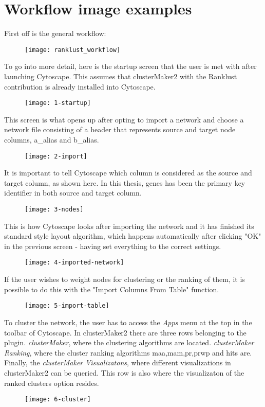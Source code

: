 \section{Workflow image examples}
First off is the general workflow:
\begin{figure}[H]
    \texttt{[image: ranklust\_workflow]}
\end{figure}

To go into more detail, here is the startup screen that the user is met with
after launching Cytoscape. This assumes that clusterMaker2 with the Ranklust
contribution is already installed into Cytoscape.
\begin{figure}[H]
    \texttt{[image: 1-startup]}
\end{figure}

This screen is what opens up after opting to import a network and choose a
network file consisting of a header that represents source and target node
columns, a\_alias and b\_alias.
\begin{figure}[H]
    \texttt{[image: 2-import]}
\end{figure}

It is important to tell Cytoscape which column is considered as the source and
target column, as shown here. In this thesis, genes has been the primary key
identifier in both source and target column.
\begin{figure}[H]
    \texttt{[image: 3-nodes]}
\end{figure}

This is how Cytoscape looks after importing the network and it has finished its
standard style layout algorithm, which happens automatically after clicking "OK"
in the previous screen - having set everything to the correct settings.
\begin{figure}[H]
    \texttt{[image: 4-imported-network]}
\end{figure}

If the user wishes to weight nodes for clustering or the ranking of them, it is
possible to do this with the "Import Columns From Table" function.
\begin{figure}[H]
    \texttt{[image: 5-import-table]}
\end{figure}

To cluster the network, the user has to access the \textit{Apps} menu at the top
in the toolbar of Cytoscape. In clusterMaker2 there are three rows belonging
to the plugin. \textit{clusterMaker}, where the clustering algorithms are
located. \textit{clusterMaker Ranking}, where the cluster ranking algorithms
\gls{maa},\gls{mam},\gls{pr},\gls{prwp} and \gls{hits} are. Finally, the
\textit{clusterMaker Visualizatons}, where different visualizations in
clusterMaker2 can be queried. This row is also where the visualizaton of the
ranked clusters option resides.
\begin{figure}[H]
    \texttt{[image: 6-cluster]}
\end{figure}

